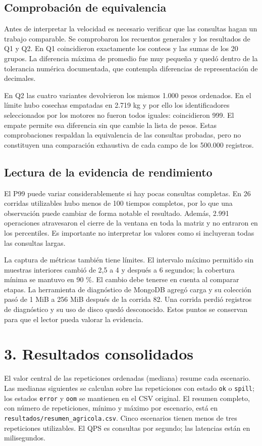 \documentclass[12pt,letterpaper]{article}
\begin{document}
\subsection*{Comprobación de equivalencia}
Antes de interpretar la velocidad es necesario verificar que las consultas hagan un trabajo comparable. Se comprobaron los recuentos generales y los resultados de Q1 y Q2. En Q1 coincidieron exactamente los conteos y las sumas de los 20 grupos. La diferencia máxima de promedio fue muy pequeña y quedó dentro de la tolerancia numérica documentada, que contempla diferencias de representación de decimales.

En Q2 las cuatro variantes devolvieron los mismos 1.000 pesos ordenados. En el límite hubo cosechas empatadas en 2.719 kg y por ello los identificadores seleccionados por los motores no fueron todos iguales: coincidieron 999. El empate permite esa diferencia sin que cambie la lista de pesos. Estas comprobaciones respaldan la equivalencia de las consultas probadas, pero no constituyen una comparación exhaustiva de cada campo de los 500.000 registros.

\subsection*{Lectura de la evidencia de rendimiento}
El P99 puede variar considerablemente si hay pocas consultas completas. En 26 corridas utilizables hubo menos de 100 tiempos completos, por lo que una observación puede cambiar de forma notable el resultado. Además, 2.991 operaciones atravesaron el cierre de la ventana en toda la matriz y no entraron en los percentiles. Es importante no interpretar los valores como si incluyeran todas las consultas largas.

La captura de métricas también tiene límites. El intervalo máximo permitido sin muestras interiores cambió de 2,5 a 4 y después a 6 segundos; la cobertura mínima se mantuvo en 90 \%. El cambio debe tenerse en cuenta al comparar etapas. La herramienta de diagnóstico de MongoDB agregó carga y su colección pasó de 1 MiB a 256 MiB después de la corrida 82. Una corrida perdió registros de diagnóstico y su uso de disco quedó desconocido. Estos puntos se conservan para que el lector pueda valorar la evidencia.

\section*{3. Resultados consolidados}
El valor central de las repeticiones ordenadas (mediana) resume cada escenario. Las medianas siguientes se calculan sobre las repeticiones con estado \texttt{ok} o \texttt{spill}; los estados \texttt{error} y \texttt{oom} se mantienen en el CSV original. El resumen completo, con número de repeticiones, mínimo y máximo por escenario, está en \texttt{resultados/\allowbreak{}resumen\_\allowbreak{}agricola.csv}. Cinco escenarios tienen menos de tres repeticiones utilizables. El QPS es consultas por segundo; las latencias están en milisegundos.
\end{document}
